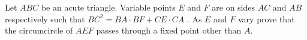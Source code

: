 Let $ABC$ be an acute triangle. Variable points $E$ and $F$ are on sides $AC$ and $AB$ respectively such that $BC^2 = BA\cdot  BF + CE \cdot CA$ . As $E$ and $F$ vary prove that the circumcircle of $AEF$ passes through a fixed point other than $A$.